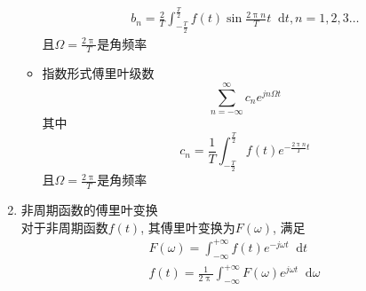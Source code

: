 \documentclass[UTF8]{ctexrep}
\newcommand{\dif}{\mathop{}\!{}\mathrm{d}}
\begin{document}
\begin{enumerate}
\begin{itemize}
\begin{gather*}
b_n=\frac{2}{T}\int_{-\frac{T}{2}}^{\frac{T}{2}}f(t)\sin\frac{2\uppi n}{T}t\dif t, n=1, 2, 3\ldots 
\end{gather*}
且$\Omega=\frac{2\uppi}{T}$是角频率
\item 指数形式傅里叶级数
\[\sum_{n=-\infty}^{\infty}c_ne^{jn\Omega t}\]
其中
\[
c_n=\frac{1}{T}\int_{-\frac{T}{2}}^{\frac{T}{2}}f(t)e^{-\frac{2\uppi n}{T}t}
\]
且$\Omega=\frac{2\uppi}{T}$是角频率
\end{itemize}
\item 非周期函数的傅里叶变换\\
对于非周期函数$f(t)$, 其傅里叶变换为$F(\omega)$, 满足
\begin{gather*}
F(\omega)=\int_{-\infty}^{+\infty}f(t)e^{-j\omega t}\dif t\\
f(t)=\frac{1}{2\uppi}\int_{-\infty}^{+\infty}F(\omega)e^{j\omega t}\dif \omega
\end{gather*}


\end{enumerate}
\end{document}
